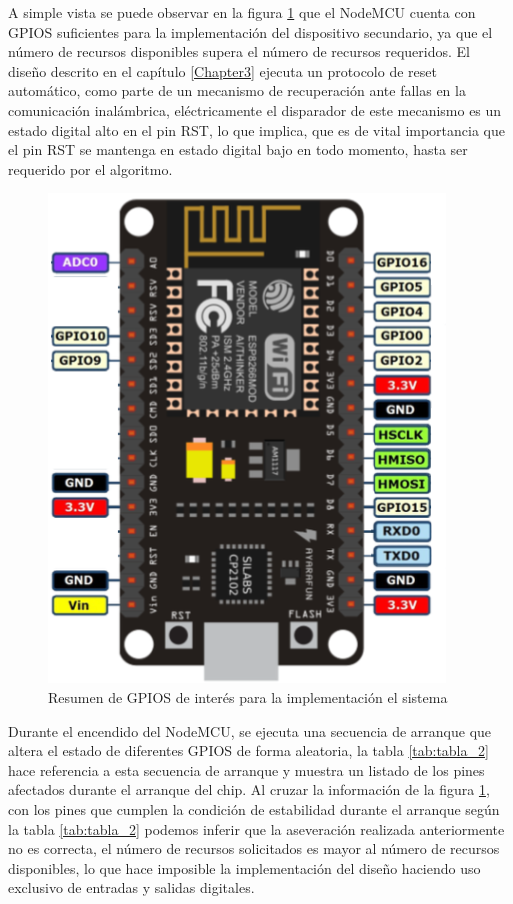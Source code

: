 A simple vista se puede observar en la figura \ref{fig:figura_e} que el NodeMCU cuenta con GPIOS suficientes para la implementación del dispositivo secundario, ya que el número de recursos disponibles supera el número de recursos requeridos. El diseño descrito en el capítulo \ref{Chapter3} ejecuta un protocolo de reset automático, como parte de un mecanismo de  recuperación ante fallas en la comunicación inalámbrica, eléctricamente el disparador de este mecanismo es un estado digital alto en el pin RST, lo que implica, que es de vital importancia que el pin RST se mantenga en estado digital bajo en todo momento, hasta ser requerido por el algoritmo.

\begin{figure}[ht]
	\centering
	\includegraphics[scale=.45]{./Figures/Capitulo4/Figura_E.png}
	\caption{Resumen de GPIOS de interés para la implementación el sistema}
	\label{fig:figura_e}
\end{figure}

Durante el encendido del NodeMCU, se ejecuta una secuencia de arranque que altera el estado de diferentes GPIOS de forma aleatoria, la tabla \ref{tab:tabla_2} hace referencia a esta secuencia de arranque y muestra un listado de los pines afectados durante el arranque del chip. Al cruzar la información de la figura \ref{fig:figura_e}, con los pines que cumplen la condición de estabilidad durante el arranque según la tabla \ref{tab:tabla_2} podemos inferir que la aseveración realizada anteriormente no es correcta, el número de recursos solicitados es mayor al número de recursos disponibles, lo que hace imposible la implementación del diseño haciendo uso exclusivo de entradas y salidas digitales.

